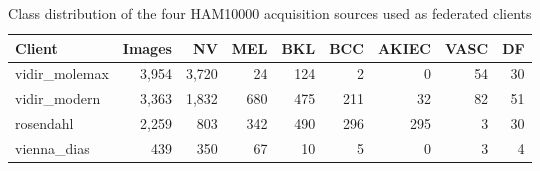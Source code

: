 \begin{table}[t]
\caption{Class distribution of the four HAM10000 acquisition sources used as federated clients}
\label{tab:fl_clients}
\centering
\footnotesize
\setlength{\tabcolsep}{3pt}
\begin{tabular}{lrrrrrrrr}
\hline
Client & Images & NV & MEL & BKL & BCC & AKIEC & VASC & DF \\
\hline
vidir\_molemax & 3,954 & 3,720 & 24 & 124 & 2 & 0 & 54 & 30 \\
vidir\_modern & 3,363 & 1,832 & 680 & 475 & 211 & 32 & 82 & 51 \\
rosendahl & 2,259 & 803 & 342 & 490 & 296 & 295 & 3 & 30 \\
vienna\_dias & 439 & 350 & 67 & 10 & 5 & 0 & 3 & 4 \\
\hline
\end{tabular}
\end{table}
